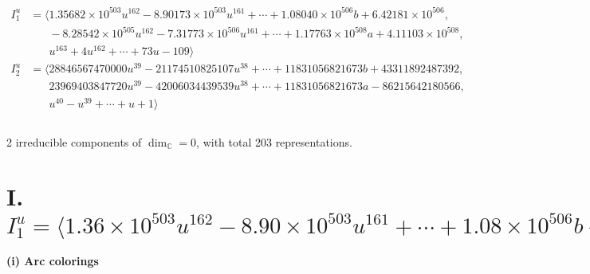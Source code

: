 \documentclass[1p]{elsarticle_modified}
\theoremstyle{definition}
\begin{document}
\begin{align*}
I^u_{1}&=\langle 
1.35682\times10^{503} u^{162}-8.90173\times10^{503} u^{161}+\cdots+1.08040\times10^{506} b+6.42181\times10^{506},\\
\phantom{I^u_{1}}&\phantom{= \langle  }-8.28542\times10^{505} u^{162}-7.31773\times10^{506} u^{161}+\cdots+1.17763\times10^{508} a+4.11103\times10^{508},\\
\phantom{I^u_{1}}&\phantom{= \langle  }u^{163}+4 u^{162}+\cdots+73 u-109\rangle \\
I^u_{2}&=\langle 
28846567470000 u^{39}-21174510825107 u^{38}+\cdots+11831056821673 b+43311892487392,\\
\phantom{I^u_{2}}&\phantom{= \langle  }23969403847720 u^{39}-42006034439539 u^{38}+\cdots+11831056821673 a-86215642180566,\\
\phantom{I^u_{2}}&\phantom{= \langle  }u^{40}- u^{39}+\cdots+u+1\rangle \\
\\
\end{align*}
\raggedright * 2 irreducible components of $\dim_{\mathbb{C}}=0$, with total 203 representations.\\
\newpage
\renewcommand{\arraystretch}{1}
\centering \section*{I. $I^u_{1}= \langle 1.36\times10^{503} u^{162}-8.90\times10^{503} u^{161}+\cdots+1.08\times10^{506} b+6.42\times10^{506},\;-8.29\times10^{505} u^{162}-7.32\times10^{506} u^{161}+\cdots+1.18\times10^{508} a+4.11\times10^{508},\;u^{163}+4 u^{162}+\cdots+73 u-109 \rangle$}
\flushleft \textbf{(i) Arc colorings}\\
\end{document}
